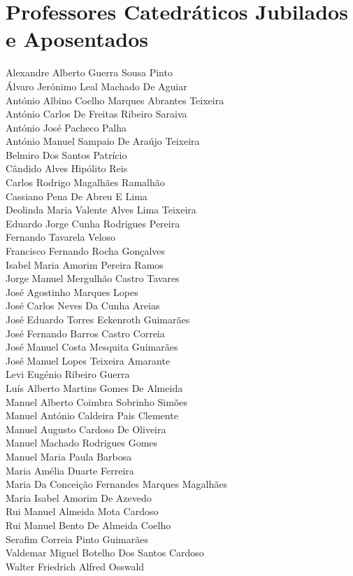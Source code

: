 \chapter*{Professores Catedráticos Jubilados e Aposentados}

Alexandre Alberto Guerra Sousa Pinto\\ 
Álvaro Jerónimo Leal Machado De Aguiar\\ 
António Albino Coelho Marques Abrantes Teixeira \\ 
António Carlos De Freitas Ribeiro Saraiva\\ 
António José Pacheco Palha\\ 
António Manuel Sampaio De Araújo Teixeira \\ 
Belmiro Dos Santos Patrício\\ 
Cândido Alves Hipólito Reis\\ 
Carlos Rodrigo Magalhães Ramalhão\\ 
Cassiano Pena De Abreu E Lima\\ 
Deolinda Maria Valente Alves Lima Teixeira \\ 
Eduardo Jorge Cunha Rodrigues Pereira\\ 
Fernando Tavarela Veloso\\ 
Francisco Fernando Rocha Gonçalves\\ 
Isabel Maria Amorim Pereira Ramos\\ 
Jorge Manuel Mergulhão Castro Tavares\\ 
José Agostinho Marques Lopes\\ 
José Carlos Neves Da Cunha Areias\\ 
José Eduardo Torres Eckenroth Guimarães\\ 
José Fernando Barros Castro Correia\\ 
José Manuel Costa Mesquita Guimarães\\ 
José Manuel Lopes Teixeira Amarante\\ 
Levi Eugénio Ribeiro Guerra\\ 
Luís Alberto Martins Gomes De Almeida\\ 
Manuel Alberto Coimbra Sobrinho Simões\\ 
Manuel António Caldeira Pais Clemente\\ 
Manuel Augusto Cardoso De Oliveira\\ 
Manuel Machado Rodrigues Gomes\\ 
Manuel Maria Paula Barbosa\\ 
Maria Amélia Duarte Ferreira\\ 
Maria Da Conceição Fernandes Marques Magalhães \\ 
Maria Isabel Amorim De Azevedo\\ 
Rui Manuel Almeida Mota Cardoso\\ 
Rui Manuel Bento De Almeida Coelho\\ 
Serafim Correia Pinto Guimarães\\ 
Valdemar Miguel Botelho Dos Santos Cardoso \\ 
Walter Friedrich Alfred Osswald